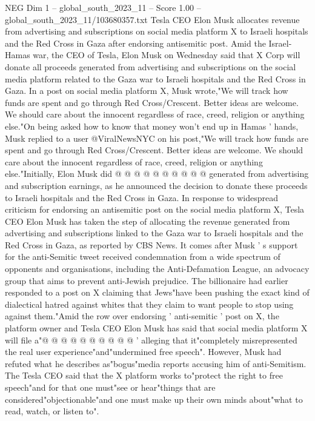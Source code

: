 \begin{textsample}{NEG Dim 1 – global\_south\_2023\_11 – Score 1.00 – global\_south\_2023\_11/103680357.txt}  \label{ex:f1_neg_325}
Tesla CEO Elon Musk allocates revenue from advertising and subscriptions on social media platform X to Israeli hospitals and the Red Cross in Gaza after endorsing antisemitic post.
Amid the Israel-Hamas war, the CEO of Tesla, Elon Musk on Wednesday said that X Corp will donate all proceeds generated from advertising and subscriptions on the social media platform related to the Gaza war to Israeli hospitals and the Red Cross in Gaza.
In a post on social media platform X, Musk wrote,"We will track how funds are spent and go through Red Cross/Crescent.
Better ideas are welcome.
We should care about the innocent regardless of race, creed, religion or anything else."On being asked how to know that money won't end up in Hamas ' hands, Musk replied to a user @ViralNewsNYC on his post,"We will track how funds are spent and go through Red Cross/Crescent.
Better ideas are welcome.
We should care about the innocent regardless of race, creed, religion or anything else."Initially, Elon Musk did @ @ @ @ @ @ @ @ @ @ generated from advertising and subscription earnings, as he announced the decision to donate these proceeds to Israeli hospitals and the Red Cross in Gaza.
In response to widespread criticism for endorsing an antisemitic post on the social media platform X, Tesla CEO Elon Musk has taken the step of allocating the revenue generated from advertising and subscriptions linked to the Gaza war to Israeli hospitals and the Red Cross in Gaza, as reported by CBS News.
It comes after Musk ' s support for the anti-Semitic tweet received condemnation from a wide spectrum of opponents and organisations, including the Anti-Defamation League, an advocacy group that aims to prevent anti-Jewish prejudice.
The billionaire had earlier responded to a post on X claiming that Jews"have been pushing the exact kind of dialectical hatred against whites that they claim to want people to stop using against them."Amid the row over endorsing ' anti-semitic ' post on X, the platform owner and Tesla CEO Elon Musk has said that social media platform X will file a"@ @ @ @ @ @ @ @ @ @ ' alleging that it"completely misrepresented the real user experience"and"undermined free speech".
However, Musk had refuted what he describes as"bogus"media reports accusing him of anti-Semitism.
The Tesla CEO said that the X platform works to"protect the right to free speech"and for that one must"see or hear"things that are considered"objectionable"and one must make up their own minds about"what to read, watch, or listen to".

\end{textsample}
